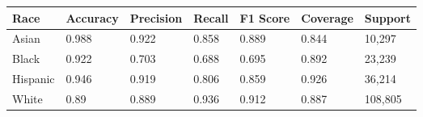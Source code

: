 \begin{tabular}{lllllll}
\toprule
Race & Accuracy & Precision & Recall & F1 Score & Coverage & Support \\
\midrule
Asian & 0.988 & 0.922 & 0.858 & 0.889 & 0.844 & 10,297 \\
Black & 0.922 & 0.703 & 0.688 & 0.695 & 0.892 & 23,239 \\
Hispanic & 0.946 & 0.919 & 0.806 & 0.859 & 0.926 & 36,214 \\
White & 0.89 & 0.889 & 0.936 & 0.912 & 0.887 & 108,805 \\
\bottomrule
\end{tabular}
